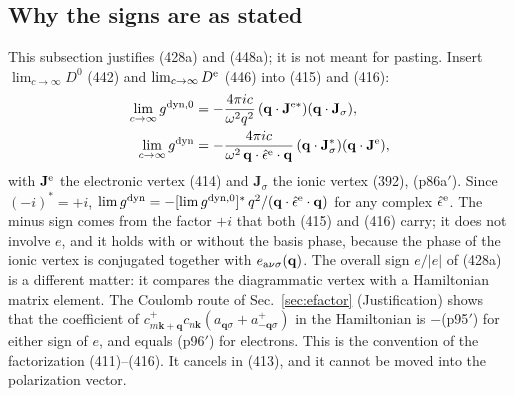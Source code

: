 \documentclass[11pt]{article}
\begin{document}
\subsection{Why the signs are as stated}\label{sec:int-signs}
This subsection justifies (428a) and (448a); it is not meant for pasting. Insert $\lim_{c\to\infty}D^0$
(442) and $\lim_{c\to\infty}D^{\rm e}$ (446) into (415) and (416):
\begin{equation*}
\begin{aligned}
\lim_{c\to\infty}g^{\rm dyn,0}&=-\frac{4\pi ic}{\omega^2q^2}\,
(\mathbf q\cdot\mathbf J^{{\rm e}*})(\mathbf q\cdot\mathbf J_\sigma),\\
\lim_{c\to\infty}g^{\rm dyn}&=-\frac{4\pi ic}{\omega^2\,\mathbf q\cdot\hat\epsilon^{\rm e}\cdot\mathbf q}\,
(\mathbf q\cdot\mathbf J^*_\sigma)(\mathbf q\cdot\mathbf J^{\rm e}),
\end{aligned}
\end{equation*}
with $\mathbf J^{\rm e}$ the electronic vertex (414) and $\mathbf J_\sigma$ the ionic vertex (392), (p86a$'$).
Since $(-i)^*=+i$, $\lim g^{\rm dyn}=-[\lim g^{\rm dyn,0}]^*\,q^2/(\mathbf q\cdot\hat\epsilon^{\rm e}\cdot\mathbf q)$
for any complex $\hat\epsilon^{\rm e}$. The minus sign comes from the factor $+i$ that both (415) and (416)
carry; it does not involve $e$, and it holds with or without the basis phase, because the phase of the
ionic vertex is conjugated together with $e_{{\rm a}\nu\sigma}(\mathbf q)$. The overall sign $e/|e|$ of
(428a) is a different matter: it compares the diagrammatic vertex with a Hamiltonian matrix element. The
Coulomb route of Sec.~\ref{sec:efactor} (Justification) shows that the coefficient of
$c^+_{m\mathbf k+\mathbf q}c_{n\mathbf k}(a_{\mathbf q\sigma}+a^+_{-\mathbf q\sigma})$ in the Hamiltonian is
$-$(p95$'$) for either sign of $e$, and equals (p96$'$) for electrons. This is the convention of the
factorization (411)--(416). It cancels in (413), and it cannot be moved into the polarization vector.
\end{document}

